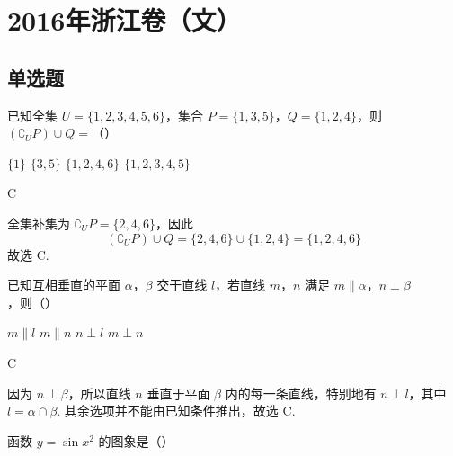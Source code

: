 \chapter{2016年浙江卷（文）}

\section{单选题}

\begin{problem}
已知全集 \(U=\{1,2,3,4,5,6\}\)，集合 \(P=\{1,3,5\}\)，\(Q=\{1,2,4\}\)，则 \((\complement_U P)\cup Q=\)（\quad）

\choices
    {\(\{1\}\)}
    {\(\{3,5\}\)}
    {\(\{1,2,4,6\}\)}
    {\(\{1,2,3,4,5\}\)}
\end{problem}

\begin{answer}
C
\end{answer}

\begin{solution}
全集补集为 \(\complement_U P=\{2,4,6\}\)，因此
\[
(\complement_U P)\cup Q=\{2,4,6\}\cup\{1,2,4\}=\{1,2,4,6\}
\]
故选 C.
\end{solution}

\begin{problem}
已知互相垂直的平面 \(\alpha\)，\(\beta\) 交于直线 \(l\)，若直线 \(m\)，\(n\) 满足 \(m\parallel\alpha\)，\(n\perp\beta\)，则（\quad）

\choices
    {\(m\parallel l\)}
    {\(m\parallel n\)}
    {\(n\perp l\)}
    {\(m\perp n\)}
\end{problem}

\begin{answer}
C
\end{answer}

\begin{solution}
因为 \(n\perp\beta\)，所以直线 \(n\) 垂直于平面 \(\beta\) 内的每一条直线，特别地有 \(n\perp l\)，其中 \(l=\alpha\cap\beta\). 其余选项并不能由已知条件推出，故选 C.
\end{solution}

\begin{problem}
函数 \(y=\sin x^2\) 的图象是（\quad）

    {}
    {}
    {}
\end{problem}

